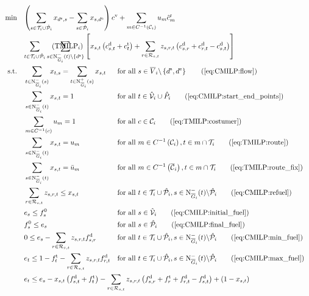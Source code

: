 \begin{align}
	\min \quad & \omit\rlap{$\displaystyle{\left(\sum_{s\in\Ti\cup\Phat_i} x_{\ds,s} - \sum_{s\in\Phat_i} x_{s,\de}\right) \cv + \sum_{m\in C^{-1}\left(\mathcal{C}_i\right)} u_m \hat{c}^{\operatorname{r}}_m}$} \nonumber \\
	& \omit\rlap{$\displaystyle{\sum_{t\in\Ti\cup\Phat_i}\sum_{s\in\Ninoi(t)\backslash\left\{\ds\right\}}\left[x_{s,t}\left(\cd_{s,t}+\ct_t\right)+\sum_{r\in\Rst}z_{s,r,t}\left(\cd_{s,r}+\cd_{r,t}-\cd_{s,t}\right)\right]}$} \tag{$\operatorname{TMILP}_i$} \label{eq:TMILPi} \\
	\text{s.t.} \quad & \sum_{t\in\Ninoi(s)} x_{t,s} = \sum_{t\in\Noutoi(s)} x_{s,t} & & \text{for all } s\in \overline{V}_i\backslash\left\{\ds,\de\right\} \tag{\ref{eq:CMILP:flow}} \\
	&\sum_{s\in\Ninoi(t)} x_{s,t} = 1 && \text{for all } t\in\hat{\mathcal{V}}_i\cup\hat{P}_i \tag{\ref{eq:CMILP:start_end_points}} \\
	&\sum_{m\in C^{-1}(c)} u_m = 1 && \text{for all } c\in\mathcal{C}_i \tag{\ref{eq:TMILP:costumer}} \\
	&\sum_{s\in\Ninoi(t)} x_{s,t} = u_m && \text{for all } m\in C^{-1}\left(\mathcal{C}_i\right), t\in m\cap\Ti \tag{\ref{eq:TMILP:route}} \\
	&\sum_{s\in\Ninoi(t)} x_{s,t} = \bar{u}_m && \text{for all } m\in C^{-1}\left(\overline{\mathcal{C}}_i\right), t\in m\cap\Ti \tag{\ref{eq:TMILP:route_fix}} \\
	& \sum_{r\in\Rst} z_{s,r,t} \leq x_{s,t} & & \text{for all } t\in\Ti\cup\Phat_i, s\in\Ninoi(t)\backslash\Phat_i \tag{\ref{eq:CMILP:refuel}} \\
	& e_s \leq f_s^0 & & \text{for all } s\in\Vhat_i \tag{\ref{eq:CMILP:initial_fuel}} \\
	& f^0_s \leq e_s && \text{for all } s\in\Phat_i \tag{\ref{eq:CMILP:final_fuel}} \\
	& 0 \leq e_s - \sum_{r\in\Rst} z_{s,r,t}\fd_{s,r} & & \text{for all } t\in\Ti\cup\Phat_i, s\in\Ninoi(t)\backslash\Phat_i \tag{\ref{eq:CMILP:min_fuel}} \\
	& e_t \leq 1 - \ft_t - \sum_{r\in\Rst} z_{s,r,t}\fd_{r,t} & & \text{for all } t\in\Ti\cup\Phat_i, s\in\Ninoi(t)\backslash\Phat_i \tag{\ref{eq:CMILP:max_fuel}} \\
	& \omit\rlap{$\displaystyle{e_t \leq e_s - x_{s,t}\left(f_{s,t}^{\operatorname{d}}+f_t^{\operatorname{t}}\right) - \sum_{r\in\Rst} z_{s,r,t}\left(\fd_{s,r}+\ft_r+\fd_{r,t}-\fd_{s,t}\right) + \left(1-x_{s,t}\right)}$} \nonumber \\

\end{align}
